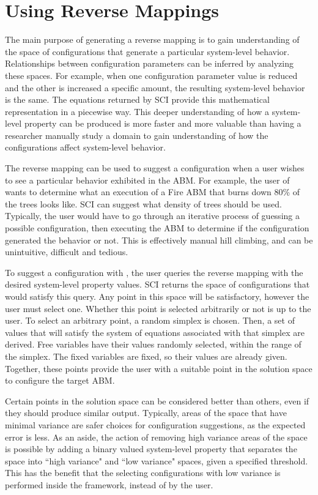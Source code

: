 \section{Using Reverse Mappings}

The main purpose of generating a reverse mapping is to gain understanding of the space of configurations that generate a particular system-level behavior.
Relationships between configuration parameters can be inferred by analyzing these spaces.
For example, when one configuration parameter value is reduced and the other is increased a specific amount, the resulting system-level behavior is the same.
The equations returned by SCI provide this mathematical representation in a piecewise way.
This deeper understanding of how a system-level property can be produced is more faster and more valuable than having a researcher manually study a domain to gain understanding of how the configurations affect system-level behavior.

The reverse mapping can be used to suggest a configuration when a user wishes to see a particular behavior exhibited in the ABM.
For example, the user of \fw wants to determine what an execution of a Fire ABM that burns down 80\% of the trees looks like.
SCI can suggest what density of trees should be used.
Typically, the user would have to go through an iterative process of guessing a possible configuration, then executing the ABM to determine if the configuration generated the behavior or not.
This is effectively manual hill climbing, and can be unintuitive, difficult and tedious.

To suggest a configuration with \fw, the user queries the reverse mapping with the desired system-level property values.
SCI returns the space of configurations that would satisfy this query.
Any point in this space will be satisfactory, however the user must select one.
Whether this point is selected arbitrarily or not is up to the user.
To select an arbitrary point, a random simplex is chosen.
Then, a set of values that will satisfy the system of equations associated with that simplex are derived.
Free variables have their values randomly selected, within the range of the simplex.
The fixed variables are fixed, so their values are already given.
Together, these points provide the user with a suitable point in the solution space to configure the target ABM.

Certain points in the solution space can be considered better than others, even if they should produce similar output.
Typically, areas of the space that have minimal variance are safer choices for configuration suggestions, as the expected error is less.
As an aside, the action of removing high variance areas of the space is possible by adding a binary valued system-level property that separates the space into ``high variance" and ``low variance" spaces, given a specified threshold.
This has the benefit that the selecting configurations with low variance is performed inside the framework, instead of by the user.


